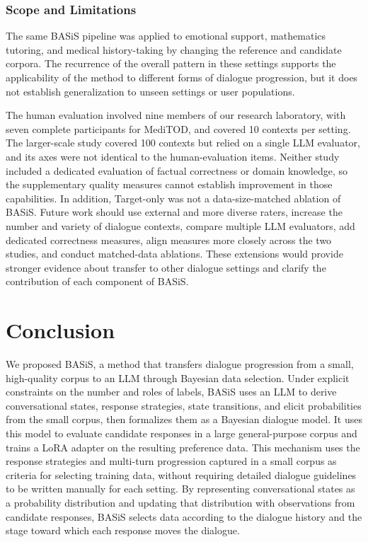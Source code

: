 \documentclass[manuscript,review,anonymous]{acmart}
\begin{document}
\subsubsection{Scope and Limitations}

The same BASiS pipeline was applied to emotional support, mathematics tutoring, and medical history-taking by changing the reference and candidate corpora. The recurrence of the overall pattern in these settings supports the applicability of the method to different forms of dialogue progression, but it does not establish generalization to unseen settings or user populations.

The human evaluation involved nine members of our research laboratory, with seven complete participants for MediTOD, and covered 10 contexts per setting. The larger-scale study covered 100 contexts but relied on a single LLM evaluator, and its axes were not identical to the human-evaluation items. Neither study included a dedicated evaluation of factual correctness or domain knowledge, so the supplementary quality measures cannot establish improvement in those capabilities. In addition, Target-only was not a data-size-matched ablation of BASiS. Future work should use external and more diverse raters, increase the number and variety of dialogue contexts, compare multiple LLM evaluators, add dedicated correctness measures, align measures more closely across the two studies, and conduct matched-data ablations. These extensions would provide stronger evidence about transfer to other dialogue settings and clarify the contribution of each component of BASiS.

\section{Conclusion}
\label{sec:conclusion}

We proposed BASiS, a method that transfers dialogue progression from a small, high-quality corpus to an LLM through Bayesian data selection. Under explicit constraints on the number and roles of labels, BASiS uses an LLM to derive conversational states, response strategies, state transitions, and elicit probabilities from the small corpus, then formalizes them as a Bayesian dialogue model. It uses this model to evaluate candidate responses in a large general-purpose corpus and trains a LoRA adapter on the resulting preference data.
This mechanism uses the response strategies and multi-turn progression captured in a small corpus as criteria for selecting training data, without requiring detailed dialogue guidelines to be written manually for each setting. By representing conversational states as a probability distribution and updating that distribution with observations from candidate responses, BASiS selects data according to the dialogue history and the stage toward which each response moves the dialogue.
\end{document}

